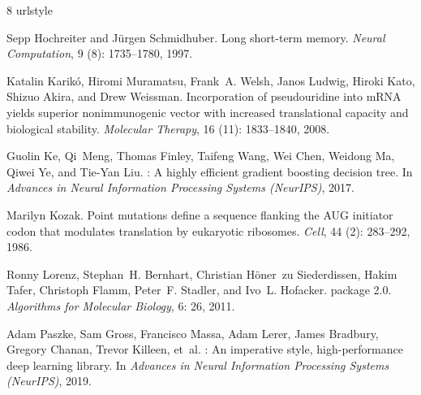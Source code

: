 \documentclass{article}
\begin{document}
% 
% 
\begin{thebibliography}{8}
\providecommand{\natexlab}[1]{#1}
\providecommand{\url}[1]{\texttt{#1}}
\expandafter\ifx\csname urlstyle\endcsname\relax
  \providecommand{\doi}[1]{doi: #1}\else
  \providecommand{\doi}{doi: \begingroup \urlstyle{rm}\Url}\fi

Sepp Hochreiter and J{\"u}rgen Schmidhuber.
\newblock Long short-term memory.
\newblock \emph{Neural Computation}, 9 (8): 1735--1780, 1997.

Katalin Karik{\'o}, Hiromi Muramatsu, Frank~A. Welsh, Janos Ludwig, Hiroki
  Kato, Shizuo Akira, and Drew Weissman.
\newblock Incorporation of pseudouridine into {mRNA} yields superior
  nonimmunogenic vector with increased translational capacity and biological
  stability.
\newblock \emph{Molecular Therapy}, 16 (11): 1833--1840,
  2008.

Guolin Ke, Qi~Meng, Thomas Finley, Taifeng Wang, Wei Chen, Weidong Ma, Qiwei
  Ye, and Tie-Yan Liu.
: A highly efficient gradient boosting decision tree.
\newblock In \emph{Advances in Neural Information Processing Systems
  (NeurIPS)}, 2017.

Marilyn Kozak.
\newblock Point mutations define a sequence flanking the {AUG} initiator codon
  that modulates translation by eukaryotic ribosomes.
\newblock \emph{Cell}, 44 (2): 283--292, 1986.

Ronny Lorenz, Stephan~H. Bernhart, Christian H{\"o}ner~zu Siederdissen, Hakim
  Tafer, Christoph Flamm, Peter~F. Stadler, and Ivo~L. Hofacker.
 package 2.0.
\newblock \emph{Algorithms for Molecular Biology}, 6: 26, 2011.

Adam Paszke, Sam Gross, Francisco Massa, Adam Lerer, James Bradbury, Gregory
  Chanan, Trevor Killeen, et~al.
: An imperative style, high-performance deep learning
  library.
\newblock In \emph{Advances in Neural Information Processing Systems
  (NeurIPS)}, 2019.


\end{thebibliography}
\end{document}
